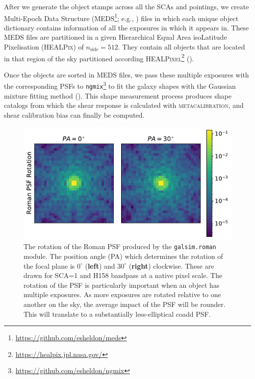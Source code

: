 \documentclass[fleqn,usenatbib]{mnras}
\begin{document}
After we generate the object stamps across all the SCAs and pointings, we create Multi-Epoch Data Structure (MEDS\footnote{\url{https://github.com/esheldon/meds}}; e.g., \citealt{2016MNRAS.460.2245J}) files in which each unique object dictionary contains information of all the exposures in which it appears in. These MEDS files are partitioned in a given Hierarchical Equal Area isoLatitude Pixelisation (\textsc{HEALPix}) of $n_{\text{side}}=512$. They contain all objects that are located in that region of the sky partitioned according \textsc{HEALPixel}\footnote{\url{https://healpix.jpl.nasa.gov/}} (\citealt{2005ApJ...622..759G, Zonca2019}). 


Once the objects are sorted in MEDS files, we pass these multiple exposures with the corresponding PSFs to \texttt{ngmix}\footnote{\url{ https://github.com/esheldon/ngmix}} to fit the galaxy shapes with the Gaussian mixture fitting method (\citealt{2014MNRAS.444L..25S}). This shape measurement process produces shape catalogs from which the shear response is calculated with \textsc{metacalibration}, and shear calibration bias can finally be computed.

\begin{figure}
	\includegraphics[width=\columnwidth]{psf_rotation.pdf}
    \caption{The rotation of the Roman PSF produced by the \texttt{galsim.roman} module. The position angle (PA) which determines the rotation of the focal plane is $0^{\circ}$ (\textbf{left}) and $30^{\circ}$ (\textbf{right}) clockwise. These are drawn for SCA=1 and H158 bandpass at a native pixel scale. The rotation of the PSF is particularly important when an object has multiple exposures. As more exposures are rotated relative to one another on the sky, the average impact of the PSF will be rounder. This will translate to a substantially less-elliptical coadd PSF.}
    \label{fig:psfrot}
\end{figure}
\end{document}
